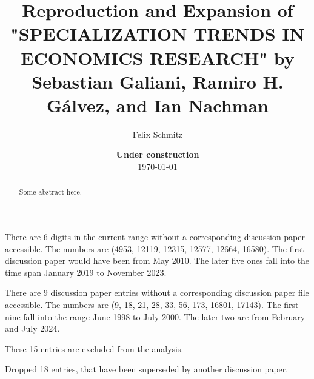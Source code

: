 \documentclass[11pt, a4paper, leqno]{article}
\begin{document}
\title{Reproduction and Expansion of \\"SPECIALIZATION TRENDS IN ECONOMICS RESEARCH" by Sebastian Galiani, Ramiro H. Gálvez, and Ian Nachman}

\author{Felix Schmitz}

\date{
    {\bf Under construction}
    \\[1ex]
    \today
}

\maketitle
{}

\begin{abstract}
    Some abstract here.
\end{abstract}

\clearpage

There are 6 digits in the current range without a corresponding discussion paper accessible.
The numbers are (4953, 12119, 12315, 12577, 12664, 16580).
The first discussion paper would have been from May 2010.
The later five ones fall into the time span January 2019 to November 2023.

There are 9 discussion paper entries without a corresponding discussion paper file accessible.
The numbers are (9, 18, 21, 28, 33, 56, 173, 16801, 17143).
The first nine fall into the range June 1998 to July 2000.
The later two are from February and July 2024.

These 15 entries are excluded from the analysis.

Dropped 18 entries, that have been superseded by another discussion paper.

\clearpage
\end{document}
